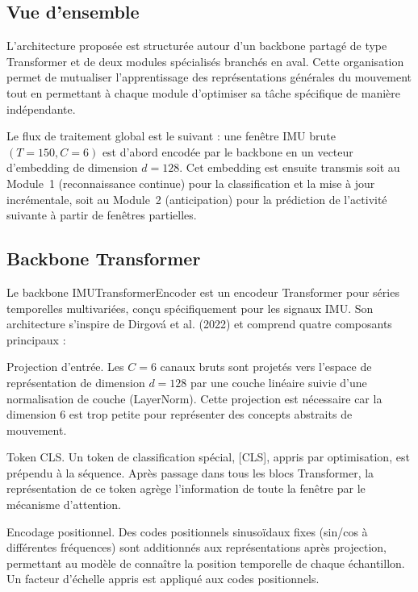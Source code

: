 \documentclass[a4paper,12pt]{report}
\begin{document}
\subsection{Vue d'ensemble}

L'architecture proposée est structurée autour d'un backbone partagé de type Transformer et de deux modules spécialisés branchés en aval. Cette organisation permet de mutualiser l'apprentissage des représentations générales du mouvement tout en permettant à chaque module d'optimiser sa tâche spécifique de manière indépendante.

Le flux de traitement global est le suivant : une fenêtre IMU brute $(T=150, C=6)$ est d'abord encodée par le backbone en un vecteur d'embedding de dimension $d=128$. Cet embedding est ensuite transmis soit au Module~1 (reconnaissance continue) pour la classification et la mise à jour incrémentale, soit au Module~2 (anticipation) pour la prédiction de l'activité suivante à partir de fenêtres partielles.



\subsection{Backbone Transformer}

Le backbone IMUTransformerEncoder est un encodeur Transformer pour séries temporelles multivariées, conçu spécifiquement pour les signaux IMU. Son architecture s'inspire de Dirgová et al. (2022) et comprend quatre composants principaux :

Projection d'entrée. Les $C = 6$ canaux bruts sont projetés vers l'espace de représentation de dimension $d = 128$ par une couche linéaire suivie d'une normalisation de couche (LayerNorm). Cette projection est nécessaire car la dimension 6 est trop petite pour représenter des concepts abstraits de mouvement.

Token CLS. Un token de classification spécial, [CLS], appris par optimisation, est prépendu à la séquence. Après passage dans tous les blocs Transformer, la représentation de ce token agrège l'information de toute la fenêtre par le mécanisme d'attention.

Encodage positionnel. Des codes positionnels sinusoïdaux fixes (sin/cos à différentes fréquences) sont additionnés aux représentations après projection, permettant au modèle de connaître la position temporelle de chaque échantillon. Un facteur d'échelle appris est appliqué aux codes positionnels.
\end{document}
